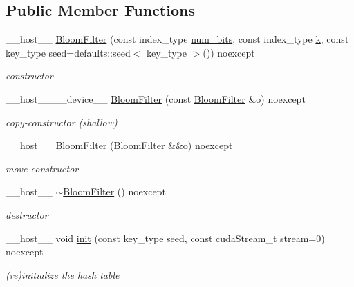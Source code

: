 \subsection*{Public Member Functions}
\begin{DoxyCompactItemize}
\item 
\+\_\+\+\_\+host\+\_\+\+\_\+ \hyperlink{classwarpcore_1_1BloomFilter_af1dee90908f026b0a7c2e60794145f2d}{Bloom\+Filter} (const index\+\_\+type \hyperlink{classwarpcore_1_1BloomFilter_a54a25926cf770e834c47ad5164e91443}{num\+\_\+bits}, const index\+\_\+type \hyperlink{classwarpcore_1_1BloomFilter_a33c972e8a462625d6253b58bbd5585f3}{k}, const key\+\_\+type seed=defaults\+::seed$<$ key\+\_\+type $>$()) noexcept
\begin{DoxyCompactList}\small\item\em constructor \end{DoxyCompactList}\item 
\+\_\+\+\_\+host\+\_\+\+\_\+\+\_\+\+\_\+device\+\_\+\+\_\+ \hyperlink{classwarpcore_1_1BloomFilter_a883979f0bdf59e494c366eef343ea7b4}{Bloom\+Filter} (const \hyperlink{classwarpcore_1_1BloomFilter}{Bloom\+Filter} \&o) noexcept
\begin{DoxyCompactList}\small\item\em copy-\/constructor (shallow) \end{DoxyCompactList}\item 
\+\_\+\+\_\+host\+\_\+\+\_\+ \hyperlink{classwarpcore_1_1BloomFilter_aa0a03f44ed1c877335537a1e3fcb9208}{Bloom\+Filter} (\hyperlink{classwarpcore_1_1BloomFilter}{Bloom\+Filter} \&\&o) noexcept
\begin{DoxyCompactList}\small\item\em move-\/constructor \end{DoxyCompactList}\item 
\mbox{\label{classwarpcore_1_1BloomFilter_a43381c51633999d04e0002c32885e3b7}} 
\+\_\+\+\_\+host\+\_\+\+\_\+ \hyperlink{classwarpcore_1_1BloomFilter_a43381c51633999d04e0002c32885e3b7}{$\sim$\+Bloom\+Filter} () noexcept
\begin{DoxyCompactList}\small\item\em destructor \end{DoxyCompactList}\item 
\+\_\+\+\_\+host\+\_\+\+\_\+ void \hyperlink{classwarpcore_1_1BloomFilter_a5f713802c324b840918111857976755e}{init} (const key\+\_\+type seed, const cuda\+Stream\+\_\+t stream=0) noexcept
\begin{DoxyCompactList}\small\item\em (re)initialize the hash table \end{DoxyCompactList}\item 

\end{DoxyCompactItemize}
